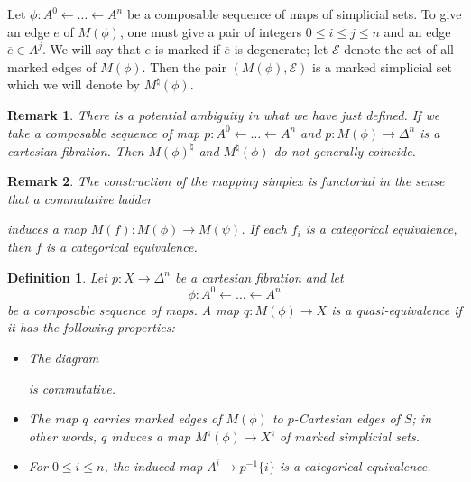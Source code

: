 \documentclass[12pt]{amsart}
\newcommand{\8}{\ensuremath{\infty}}
\newtheorem{definition}{Definition}
\newtheorem{remark}{Remark}
\begin{document}
Let $\phi:A^0\leftarrow \dots\leftarrow A^n$ be a composable sequence of maps of simplicial sets. To give an edge $e$ of $M(\phi)$, one must give a pair of integers $0\leq i\leq j\leq n$ and an edge $\overline{e}\in A^j$. We will say that $e$ is marked if $\overline{e}$ is degenerate; let $\mathcal{E}$ denote the set of all marked edges of $M(\phi)$. Then the pair $(M(\phi),\mathcal{E})$ is a marked simplicial set which we will denote by $M^\natural(\phi)$.

\begin{remark}
  There is a potential ambiguity in what we have just defined. If we take a composable sequence of map $p:A^0\leftarrow\dots\leftarrow A^n$ and $p:M(\phi)\rightarrow \Delta^n$ is a cartesian fibration. Then $M(\phi)^\natural$ and $M^\natural(\phi)$ do not generally coincide.
\end{remark}

\begin{remark}
  The construction of the mapping simplex is functorial in the sense that a commutative ladder
  induces a map $M(f):M(\phi)\rightarrow M(\psi)$. If each $f_i$ is a categorical equivalence, then $f$ is a categorical equivalence.
\end{remark}

\begin{definition}
  Let $p:X\rightarrow \Delta^n$ be a cartesian fibration and let \[\phi:A^0\leftarrow\dots\leftarrow A^n\] be a composable sequence of maps. A map $q:M(\phi)\rightarrow X$ is a quasi-equivalence if it has the following properties:
  \begin{itemize}
    \item The diagram
          is commutative.
    \item The map $q$ carries marked edges of $M(\phi)$ to $p$-Cartesian edges of $S$; in other words, $q$ induces a map $M^\natural(\phi)\rightarrow X^\natural$ of marked simplicial sets.
    \item For $0\leq i\leq n$, the induced map $A^i\rightarrow p^{-1}\{i\}$ is a categorical equivalence.
  \end{itemize}
\end{definition}
\end{document}
